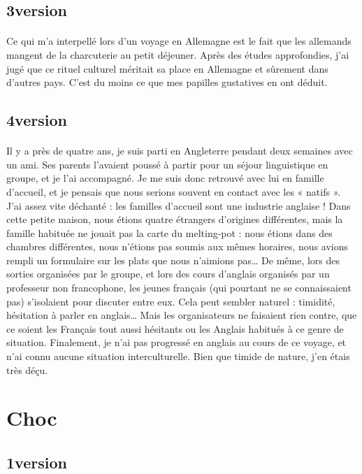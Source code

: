 \subsection{3\ieme version}
\paragraph{}
Ce qui m'a interpellé lors d'un voyage en Allemagne est le fait que les
allemands mangent de la charcuterie au petit déjeuner. Après des études
approfondies, j'ai jugé que ce rituel culturel méritait sa place en Allemagne
et sûrement dans d'autres pays. C'est du moins ce que mes papilles gustatives
en ont déduit.

\subsection{4\ieme version}
\paragraph{}
Il y a près de quatre ans, je suis parti en Angleterre pendant deux semaines
avec un ami. Ses parents l’avaient poussé à partir pour un séjour linguistique
en groupe, et je l’ai accompagné. Je me suis donc retrouvé avec lui en famille
d’accueil, et je pensais que nous serions souvent en contact avec les « natifs
». J’ai assez vite déchanté : les familles d’accueil sont une industrie
anglaise ! Dans cette petite maison, nous étions quatre étrangers d’origines
différentes, mais la famille habituée ne jouait pas la carte du melting-pot :
nous étions dans des chambres différentes, nous n’étions pas soumis aux mêmes
horaires, nous avions rempli un formulaire sur les plats que nous n’aimions
pas… De même, lors des sorties organisées par le groupe, et lors des cours
d’anglais organisés par un professeur non francophone, les jeunes français (qui
pourtant ne se connaissaient pas) s’isolaient pour discuter entre eux. Cela
peut sembler naturel : timidité, hésitation à parler en anglais… Mais les
organisateurs ne faisaient rien contre, que ce soient les Français tout aussi
hésitants ou les Anglais habitués à ce genre de situation. Finalement, je n’ai
pas progressé en anglais au cours de ce voyage, et n’ai connu aucune situation
interculturelle. Bien que timide de nature, j’en étais très déçu.


\section{Choc}
\subsection{1\ier version}
